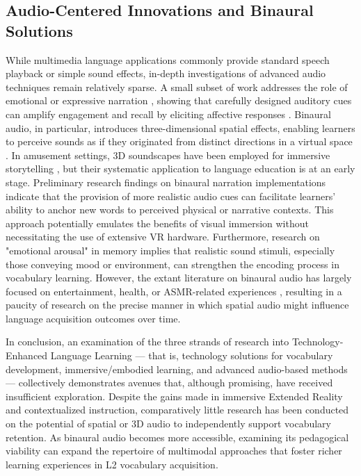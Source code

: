 \documentclass{ehissymp}
\begin{document}
\subsection{Audio-Centered Innovations and Binaural Solutions}
While multimedia language applications commonly provide standard speech playback or simple sound effects, in-depth investigations of advanced audio techniques remain relatively sparse. A small subset of work addresses the role of emotional or expressive narration \cite{Fukushima2019,Hung2018}, showing that carefully designed auditory cues can amplify engagement and recall by eliciting affective responses \cite{Kensinger2003,Phelps1997}. Binaural audio, in particular, introduces three-dimensional spatial effects, enabling learners to perceive sounds as if they originated from distinct directions in a virtual space \cite{Barratt2015}. In amusement settings, 3D soundscapes have been employed for immersive storytelling \cite{Joypolis2016}, but their systematic application to language education is at an early stage.
Preliminary research findings on binaural narration implementations indicate that the provision of more realistic audio cues can facilitate learners' ability to anchor new words to perceived physical or narrative contexts. This approach potentially emulates the benefits of visual immersion without necessitating the use of extensive VR hardware\cite{Fukushima2019}. Furthermore, research on "emotional arousal" in memory \cite{MatherSutherland2011,LaBar2006} implies that realistic sound stimuli, especially those conveying mood or environment, can strengthen the encoding process in vocabulary learning. However, the extant literature on binaural audio has largely focused on entertainment, health, or ASMR-related experiences \cite{Barratt2015}, resulting in a paucity of research on the precise manner in which spatial audio might influence language acquisition outcomes over time.

In conclusion, an examination of the three strands of research into Technology-Enhanced Language Learning --- that is, technology solutions for vocabulary development, immersive/embodied learning, and advanced audio-based methods --- collectively demonstrates avenues that, although promising, have received insufficient exploration. Despite the gains made in immersive Extended Reality and contextualized instruction, comparatively little research has been conducted on the potential of spatial or 3D audio to independently support vocabulary retention. As binaural audio becomes more accessible, examining its pedagogical viability can expand the repertoire of multimodal approaches that foster richer learning experiences in L2 vocabulary acquisition.
\end{document}
